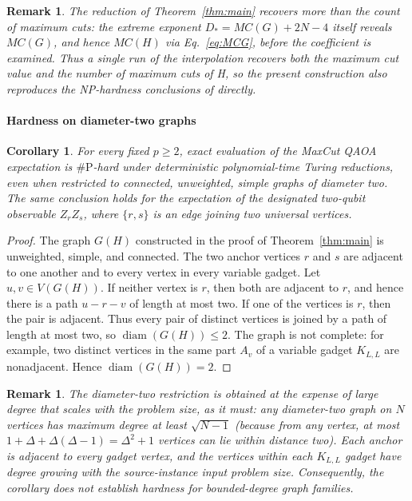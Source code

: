 \documentclass[11pt]{article}
\newtheorem{corollary}[theorem]{Corollary}
\newtheorem{remark}[theorem]{Remark}
\newcommand{\sh}[1]{{#1}}
\begin{document}
\begin{remark}
    The reduction of Theorem~\ref{thm:main} recovers more than the count of maximum cuts: the extreme exponent $D_* = MC(G) + 2N - 4$ itself reveals $MC(G)$, and hence $MC(H)$ via Eq.~\eqref{eq:MCG}, before the coefficient is examined. Thus a single run of the interpolation recovers both the maximum cut value and the number of maximum cuts of H, so the present construction also reproduces the NP-hardness conclusions of \cite{WangEtAl2025} directly.
\end{remark}



\paragraph{Hardness on diameter-two graphs}

\begin{corollary}%
\label{cor:diameter-two-hardness}
For every fixed \(p \ge 2\), exact evaluation of the MaxCut QAOA
expectation is \(\#\mathrm{P}\)-hard under deterministic
polynomial-time Turing reductions, even when restricted to connected,
unweighted, simple graphs of diameter two. The same conclusion holds
for the expectation of the designated two-qubit observable \(Z_r Z_s\),
where \(\{r,s\}\) is an edge joining two universal vertices.
\end{corollary}





\begin{proof}%
The graph \(G(H)\) constructed in the proof of
Theorem~\ref{thm:main} is unweighted, simple, and connected. The two
anchor vertices \(r\) and \(s\) are adjacent to one another and to
every vertex in every variable gadget. 
Let \(u,v \in V(G(H))\). If neither vertex is \(r\), then both are
adjacent to \(r\), and hence there is a path \(u-r-v\) of length at
most two. If one of the vertices is \(r\), then the pair is adjacent. 
Thus every pair of distinct
vertices is joined by a path of length at most two, so
$ \operatorname{diam}(G(H)) \le 2$.
The graph is not complete: for example, two distinct vertices in the
same part \(A_v\) of a variable gadget \(K_{L,L}\) are nonadjacent.
Hence 
$\operatorname{diam}(G(H)) = 2$.

\end{proof}



\begin{remark}
The diameter-two restriction is obtained at the expense of large
degree that scales with the problem size\sh{, as it must: any diameter-two graph on $N$ vertices has
maximum degree at least $\sqrt{N-1}$} (because from any vertex, at most \(1+\Delta+\Delta(\Delta-1)
=\Delta^2+1\) vertices can lie within distance two).
Each anchor is adjacent to every gadget vertex, and the
vertices within each \(K_{L,L}\) gadget have degree growing with the
source-instance 
input problem size. Consequently, the corollary does not establish
hardness for bounded-degree graph families.
\end{remark}
\end{document}
